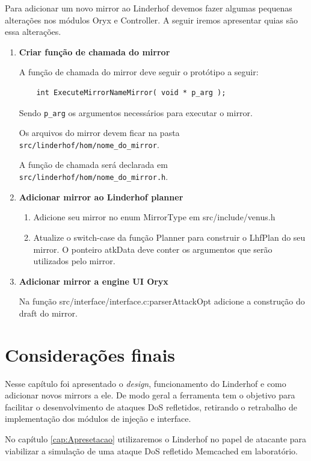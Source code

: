 Para adicionar um novo mirror ao Linderhof devemos fazer algumas pequenas alterações nos módulos Oryx e Controller. A seguir iremos apresentar quias são essa alterações.

\begin{enumerate}
    \item \textbf{Criar função de chamada do mirror}
    
    A função de chamada do mirror deve seguir o protótipo a seguir:
    
    \begin{lstlisting}
    int ExecuteMirrorNameMirror( void * p_arg );
    \end{lstlisting}
    
    Sendo \texttt{p\_arg} os argumentos necessários para executar o mirror. 
    
    Os arquivos do mirror devem ficar na pasta \texttt{src/linderhof/hom/nome\_do\_mirror}.

    A função de chamada será declarada em \texttt{src/linderhof/hom/nome\_do\_mirror.h}.
    
    \item \textbf{Adicionar mirror ao Linderhof planner}
    
        \begin{enumerate}
            \item Adicione seu mirror no enum MirrorType em src/include/venus.h
            \item Atualize o switch-case da função Planner para construir o LhfPlan do seu mirror. O ponteiro atkData deve conter os argumentos que serão utilizados pelo mirror.
        \end{enumerate}
        
    \item \textbf{Adicionar mirror a engine UI Oryx}
    
        Na função src/interface/interface.c:parserAttackOpt adicione a construção do draft do mirror.
\end{enumerate}

\section{Considerações finais}

Nesse capítulo foi apresentado o \textit{design}, funcionamento do Linderhof e como adicionar novos mirrors a ele. De modo geral a ferramenta tem o objetivo para facilitar o desenvolvimento de ataques DoS refletidos, retirando o retrabalho de implementação dos módulos de injeção e interface.

No capítulo \ref{cap:Apresetacao} utilizaremos o Linderhof no papel de atacante para viabilizar a simulação de uma ataque DoS refletido Memcached em laboratório. 
